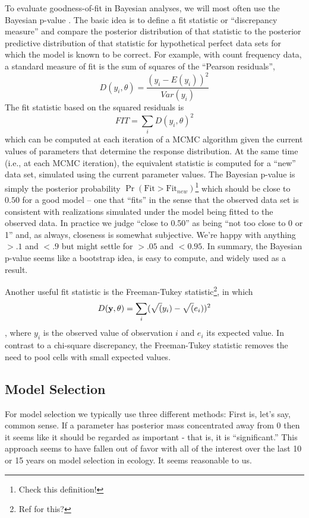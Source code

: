 To evaluate goodness-of-fit in Bayesian analyses, we will most often
use the Bayesian p-value \citep{gelman_etal:1996}.  The basic idea is to define
a fit statistic or ``discrepancy measure'' and compare the posterior distribution of that
statistic to the posterior predictive distribution of that statistic
for hypothetical perfect data sets for which the model is known to be correct. For
example, with count frequency data, a standard measure of fit is the
sum of squares of the ``Pearson residuals'',
\[
D(y_i,\theta) = \frac{(y_i - E(y_i))^{2}}{Var( y_{i} )}
\]
The fit statistic based on the squared residuals is
\[
FIT = \sum_{i} D(y_{i},\theta)^{2}
\]
which can be computed at each iteration of a MCMC algorithm given the
current values of parameters that determine the 
 response distribution.  At the same time (i.e., at each MCMC
 iteration), 
the equivalent statistic is computed for a
``new'' data set, simulated using the current parameter values. The
Bayesian p-value is simply the posterior probability $\Pr(\mbox{Fit} >
\mbox{Fit}_{new})$\footnote{Check this definition!}
 which should be close to $0.50$ for a good model -- one that
 ``fits'' in the sense that the observed data set is
 consistent with realizations simulated under the model being fitted
 to the observed data. In practice
we judge ``close to 0.50'' as being ``not too close to 0 or 1'' and,
as always, closeness is somewhat subjective. We're happy with anything
$>.1$ and $<.9$ but might settle for $>.05$ and $<0.95$. In summary,
the Bayesian p-value seems like a bootstrap idea, is easy to compute,
and widely used as a result.

Another useful fit statistic is the Freeman-Tukey
statistic\footnote{Ref for this?}, in which 
\[
D({\bf y},\theta) = \sum_{i} ( \sqrt(y_{i}) - \sqrt(e_{i}) )^2
\]
\citep{brooks_etal:2000}, where $y_{i}$ is the observed value of
observation $i$ and $e_{i}$ its expected value. In contrast to a
chi-square discrepancy, the Freeman-Tukey statistic removes the need
to pool cells with small expected values.


\subsection{Model Selection }

For model selection we typically use three different methods: First
is, let's say, common sense. If a parameter has posterior mass
concentrated away from 0 then it seems like it should be regarded as
important - that is, it is ``significant.''  This approach seems to
have fallen out of favor with all of the interest over the last 10 or
15 years on model selection in ecology. It seems reasonable to us.


